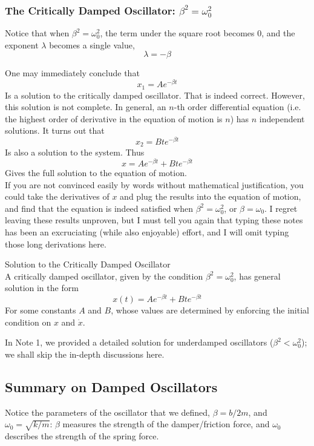 \documentclass[11pt]{article}
\theoremstyle{gangnamstyle}{\newtheorem{definition}{Definition}[]}
\theoremstyle{gangnamstyle}{\newtheorem{example}{Example}[]}
\theoremstyle{gangnamstyle}{\newtheorem{problem}{Problem}[]}
\theoremstyle{gangnamstyle}{\newtheorem{warning}{Warning}[]}
\begin{document}
\subsubsection{The Critically Damped Oscillator: $\beta^2 = \omega_0^2$}

Notice that when $\beta^2 = \omega_0^2$, the term under the square root becomes $0$, and the exponent $\lambda$ becomes a single value, 
\[ \lambda = - \beta \]

One may immediately conclude that 
\[ x_1 = Ae^{-\beta t} \]
Is a solution to the critically damped oscillator. That is indeed correct. However, this solution is not complete. In general, an $n$-th order differential equation (i.e. the highest order of derivative in the equation of motion is $n$) has $n$ independent solutions. It turns out that
\[ x_2 = Bte^{-\beta t} \]
Is also a solution to the system. Thus
\[ x = Ae^{-\beta t} + Bte^{-\beta t} \]
Gives the full solution to the equation of motion. \\ 
If you are not convinced easily by words without mathematical justification, you could take the derivatives of $x$ and plug the results into the equation of motion, and find that the equation is indeed satisfied when $\beta^2 = \omega_0^2$, or $\beta = \omega_0$. I regret leaving these results unproven, but I must tell you again that typing these notes has been an excruciating (while also enjoyable) effort, and I will omit typing those long derivations here. 

\begin{definition}
Solution to the Critically Damped Oscillator \\
A critically damped oscillator, given by the condition $\beta^2 = \omega_0^2$, has general solution in the form
\begin{equation}
x(t) = Ae^{-\beta t} + Bte^{-\beta t}
\end{equation}
For some constants $A$ and $B$, whose values are determined by enforcing the initial condition on $x$ and $\Dot{x}$. 
\end{definition}

In Note 1, we provided a detailed solution for underdamped oscillators ($\beta^2 < \omega_0^2$); we shall skip the in-depth discussions here. 

\subsection{Summary on Damped Oscillators}

Notice the parameters of the oscillator that we defined, $\beta = b/2m$, and $\omega_0 = \sqrt{k / m}$: $\beta$ measures the strength of the damper/friction force, and $\omega_0$ describes the strength of the spring force. 
\end{document}
